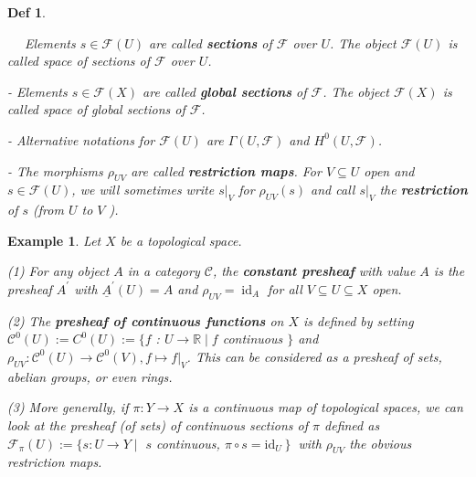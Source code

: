 \documentclass{article}
\newtheorem{definition}[theorem]{Def}
\newtheorem{example}[theorem]{Example}
\begin{document}
\begin{definition}
\begin{center}

\end{center}

$\quad$ Elements $s \in \mathcal{F}(U)$ are called \textbf{sections} of $\mathcal{F}$ over $U$. The object $\mathcal{F}(U)$ is called space of sections of $\mathcal{F}$ over $U$.

- Elements $s \in \mathcal{F}(X)$ are called \textbf{global sections} of $\mathcal{F}$. The object $\mathcal{F}(X)$ is called space of global sections of $\mathcal{F}$.

- Alternative notations for $\mathcal{F}(U)$ are $\Gamma(U, \mathcal{F})$ and $H^{0}(U, \mathcal{F})$.

- The morphisms $\rho_{U V}$ are called \textbf{restriction maps}. For $V \subseteq U$ open and $s \in \mathcal{F}(U)$, we will sometimes write $\left.s\right|_{V}$ for $\rho_{U V}(s)$ and call $\left.s\right|_{V}$ the \textbf{restriction} of $s$ (from $U$ to $V$ ).
\end{definition}
\begin{example}
Let $X$ be a topological space.

(1) For any object $A$ in a category $\mathcal{C}$, the \textbf{constant presheaf} with value $A$ is the presheaf $A^{\prime}$ with $\underline{A}^{\prime}(U)=A$ and $\rho_{U V}=\operatorname{id}_{A}$ for all $V \subseteq U \subseteq X$ open.

(2) The \textbf{presheaf of continuous functions} on $X$ is defined by setting $\mathcal{C}^{0}(U):=C^{0}(U):=\{f$ : $U \rightarrow \mathbb{R} \mid f$ continuous $\}$ and $\rho_{U V}: \mathcal{C}^{0}(U) \rightarrow \mathcal{C}^{0}(V),\left.f \mapsto f\right|_{V}$. This can be considered as a presheaf of sets, abelian groups, or even rings.

(3) More generally, if $\pi: Y \rightarrow X$ is a continuous map of topological spaces, we can look at the presheaf (of sets) of continuous sections of $\pi$ defined as $\mathcal{F}_{\pi}(U):=\{s: U \rightarrow Y \mid$ $s$ continuous, $\left.\pi \circ s=\mathrm{id}_{U}\right\}$ with $\rho_{U V}$ the obvious restriction maps.
\end{example}
\end{document}
